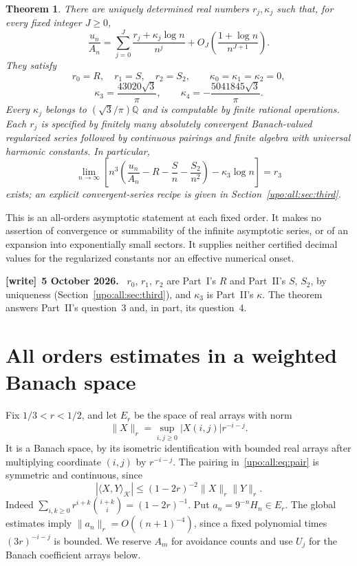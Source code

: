 \documentclass[11pt,letterpaper]{article}
\newtheorem{theorem}{Theorem}[section]
\theoremstyle{remark}\newtheorem{remark}[theorem]{Remark}
\numberwithin{equation}{section}
\newcommand{\pa}[2]{\langle #1,#2\rangle_{\mathcal K}}
\newenvironment{writenote}[1][]{\par\smallskip\begingroup\small
 \noindent\textbf{[write]}\if\relax\detokenize{#1}\relax\else~\textbf{#1.}\fi\ }%
 {\par\endgroup\smallskip}
\begin{document}
\begin{theorem}\label{upo:all:thm:main}
There are uniquely determined real numbers $r_j,\kappa_j$ such that,
for every fixed integer $J\ge0$,
\begin{equation}\label{upo:all:eq:full}
\frac{u_n}{A_n}=\sum_{j=0}^J\frac{r_j+\kappa_j\log n}{n^j}
 +O_J\left(\frac{1+\log n}{n^{J+1}}\right).
\end{equation}
They satisfy
\[
r_0=R,\quad r_1=S,\quad r_2=S_2,\qquad
\kappa_0=\kappa_1=\kappa_2=0,
\]
\begin{equation}\label{upo:all:eq:kappas}
\kappa_3=\frac{43020\sqrt3}{\pi},\qquad
\kappa_4=-\frac{5041845\sqrt3}{\pi}.
\end{equation}
Every $\kappa_j$ belongs to $(\sqrt3/\pi)\mathbb Q$ and is computable
by finite rational operations. Each $r_j$ is specified by finitely many
absolutely convergent Banach-valued regularized series followed by
continuous pairings and finite algebra with universal harmonic constants.
In particular,
\[
\lim_{n\to\infty}\left[n^3\left(\frac{u_n}{A_n}
 -R-\frac Sn-\frac{S_2}{n^2}\right)-\kappa_3\log n\right]=r_3
\]
exists; an explicit convergent-series recipe is given in
Section~\ref{upo:all:sec:third}.
\end{theorem}
This is an all-orders asymptotic statement at each fixed order. It makes
no assertion of convergence or summability of the infinite asymptotic
series, or of an expansion into exponentially small sectors. It supplies
neither certified decimal values for the regularized constants nor an
effective numerical onset.
\begin{writenote}[5 October 2026]
$r_0$, $r_1$, $r_2$ are Part~I's $R$ and Part~II's $S$, $S_2$, by uniqueness (Section~\ref{upo:all:sec:third}), and $\kappa_3$ is Part~II's $\kappa$. The theorem answers Part~II's question~3 and, in part, its question~4.
\end{writenote}

\section{All orders estimates in a weighted Banach space}\label{upo:all:sec:banach}
Fix $1/3<r<1/2$, and let $E_r$ be the space of real arrays with norm
\[
\|X\|_r=\sup_{i,j\ge0}|X(i,j)|r^{-i-j}.
\]
It is a Banach space, by its isometric identification with bounded real
arrays after multiplying coordinate $(i,j)$ by $r^{-i-j}$. The pairing in~\eqref{upo:all:eq:pair} is symmetric and
continuous, since
\begin{equation}\label{upo:all:eq:pairnorm}
|\pa XY|\le(1-2r)^{-2}\|X\|_r\|Y\|_r.
\end{equation}
Indeed $\sum_{i,k\ge0}r^{i+k}\binom{i+k}{i}=(1-2r)^{-1}$.
Put $a_n=9^{-n}H_n\in E_r$. The global estimates imply
$\|a_n\|_r=O((n+1)^{-4})$, since a fixed polynomial times
$(3r)^{-i-j}$ is bounded. We reserve $A_m$ for avoidance counts and use $U_j$ for the Banach
coefficient arrays below.
\end{document}
